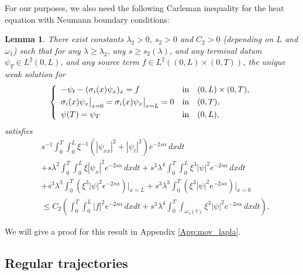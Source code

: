 \documentclass[10pt]{article}
\newtheorem{lemma}{Lemma}
\def\dis{\displaystyle}
\def\om{\omega}
\def\\Phivec{\mathbf{\Phi}}
\newcommand{\iiTL}{\int_0^T\!\!\!\!\int_0^L }
\begin{document}
 For our purposes, we also need the following Carleman inequality for the heat equation with Neumann boundary conditions:
\begin{lemma}
\label{lemma:elliptic}
   There exist constants  $\lambda _2>0$,  $s_2>0$ and
    $C_2>0$ (depending on $L$ and $\om_1$) such that  for any $\lambda \ge \lambda _2$, any
    $s\ge s_2(\lambda)$, and any terminal datum $\psi_T\in L^2(0,L)$, and any source term $f\in L^2((0,L)\times(0,T))$, the unique weak solution for
\[
    \left \{
        \begin{array}{lcl}
            -\psi_t-(\sigma_i(x) \psi_x)_x =f &\mbox{in}&    (0,L)\times(0,T),\\
            \noalign{\smallskip}\dis
\sigma_i(x)\psi_x\big|_{x=0}=\sigma_i(x)\psi_x\big|_{x=L} =0 &\mbox{in}&    (0,T),\\
            \noalign{\smallskip}\dis
            \psi(T) = \psi_T &\mbox{in}&    (0,L),
        \end{array}
    \right.
\]
    satisfies
\begin{equation}\label{carleman:neumann}
\begin{alignedat}{2}
    &s^{-1}\!\!\iiTL \!\!\!\xi^{-1}(|\psi_{xx}|^2+|\psi_t|^2)e^{-2s\alpha}\,dxdt\\
    &+
    s\lambda^2\!\!\iiTL\!\!\! \xi|\psi_x|^2e^{-2s\alpha}\,dxdt
    +s^3\lambda ^4\!\!\iiTL\!\!\! \xi^3|\psi|^2e^{-2s\alpha}
    \,dxdt\\
    &+s^3\lambda^3\int_0^T(\xi^3 |\psi|^2e^{-2s\alpha})\big|_{x=L}
    +s^3\lambda^3\int_0^T(\xi^3|\psi|^2e^{-2s\alpha})\big|_{x=0}\\
    &\le C_2 \left(\iiTL |f|^2e^{-2s \alpha}\,dxdt
    +s^3\lambda ^4\int_0^T\!\!\!\int_{\om_1(t)}
    \xi^3|\psi|^2e^{-2s\alpha}\,dxdt\right).     \end{alignedat}
\end{equation}
\end{lemma}
    We will give a proof for this result in Appendix \ref{App:mov_lapla}.


\subsection{Regular trajectories}
\end{document}
